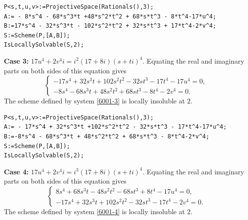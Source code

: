\documentclass[a4paper,12pt,english,reqno]{amsart}
\begin{document}
\begin{lstlisting}
P<s,t,u,v>:=ProjectiveSpace(Rationals(),3);
A:= - 8*s^4 - 68*s^3*t +48*s^2*t^2 + 68*s*t^3 - 8*t^4-17*u^4;
B:=17*s^4 - 32*s^3*t - 102*s^2*t^2 + 32*s*t^3 + 17*t^4-2*v^4;
S:=Scheme(P,[A,B]);
IsLocallySolvable(S,2);
\end{lstlisting}

{\bf Case 3:} $17u^4+2v^4i=i^2(17+8i)(s+ti)^4$. Equating the real and imaginary parts on both sides of this equation gives
\begin{equation}\label{6001-3}
\begin{cases}
-17s^4 + 32s^3t + 102s^2t^2 - 32st^3 - 17t^4 - 17u^4=0,\\
-8s^4 - 68s^3t + 48s^2t^2 + 68st^3 - 8t^4 - 2v^4=0.
\end{cases}
\end{equation}
The scheme defined by system \eqref{6001-3} is locally insoluble at $2$.

\begin{lstlisting}
P<s,t,u,v>:=ProjectiveSpace(Rationals(),3);
A:= - 17*s^4 + 32*s^3*t +102*s^2*t^2 - 32*s*t^3 - 17*t^4-17*u^4;
B:=-8*s^4 - 68*s^3*t + 48*s^2*t^2 + 68*s*t^3 - 8*t^4-2*v^4;
S:=Scheme(P,[A,B]);
IsLocallySolvable(S,2);

\end{lstlisting}



{\bf Case 4:} $17u^4+2v^4i=i^3(17+8i)(s+ti)^4$. Equating the real and imaginary parts on both sides of this equation gives
\begin{equation}\label{6001-4}
\begin{cases}
8s^4 + 68s^3t - 48s^2t^2 - 68st^3 + 8t^4 - 17u^4=0,\\
-17s^4 + 32s^3t + 102s^2t^2 - 32st^3 - 17t^4 - 2v^4=0.
\end{cases}
\end{equation}
The scheme defined by system \eqref{6001-4} is locally insoluble at $2$.
\end{document}
